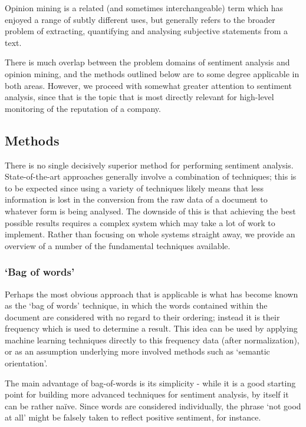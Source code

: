 \documentclass[11pt]{article}
\begin{document}
Opinion mining is a related (and sometimes interchangeable) term which has
enjoyed a range of subtly different uses\cite{Pang2008}, but generally refers
to the broader problem of extracting, quantifying and analysing subjective
statements from a text.

There is much overlap between the problem domains of sentiment analysis and
opinion mining, and the methods outlined below are to some degree applicable in
both areas. However, we proceed with somewhat greater attention to sentiment
analysis, since that is the topic that is most directly relevant for high-level
monitoring of the reputation of a company.

\subsection*{Methods}

There is no single decisively superior method for performing sentiment
analysis. State-of-the-art approaches generally involve a combination of
techniques; this is to be expected since using a variety of techniques likely
means that less information is lost in the conversion from the raw data of a
document to whatever form is being analysed. The downside of this is that
achieving the best possible results requires a complex system which may take a
lot of work to implement. Rather than focusing on whole systems straight away,
we provide an overview of a number of the fundamental techniques available.

\subsubsection*{`Bag of words'}

Perhaps the most obvious approach that is applicable is what has become known
as the `bag of words' technique, in which the words contained within the
document are considered with no regard to their ordering; instead it is their
frequency which is used to determine a result. This idea can be used by
applying machine learning techniques directly to this frequency data (after
normalization), or as an assumption underlying more involved methods such as
`semantic orientation'.

The main advantage of bag-of-words is its simplicity - while it is a good
starting point for building more advanced techniques for sentiment analysis, by
itself it can be rather naïve. Since words are considered individually, the
phrase `not good at all' might be falsely taken to reflect positive sentiment,
for instance.
\end{document}
